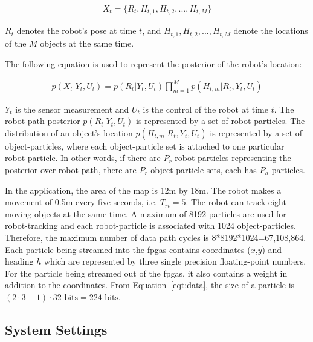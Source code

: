 \begin{equation}
\begin{aligned}
X_t = \{R_t, H_{t,1}, H_{t,2}, ..., H_{t,M}\}
\end{aligned}
\end{equation}

$R_t$ denotes the robot's pose at time $t$, and $H_{t,1}, H_{t,2}, ..., H_{t,M}$ denote the locations of the $M$ objects at the same time.

The following equation is used to represent the posterior of the robot's location:

\begin{equation}
\begin{aligned}
p(X_t|Y_t,U_t) = p(R_t|Y_t,U_t) \prod_{m=1}^M p(H_{t,m}|R_t,Y_t,U_t)
\end{aligned}
\end{equation}

$Y_t$ is the sensor measurement and $U_t$ is the control of the robot at time $t$.
The robot path posterior $p(R_t|Y_t,U_t)$ is represented by a set of robot-particles.
The distribution of an object's location $p(H_{t,m}|R_t,Y_t,U_t)$ is represented by a set of object-particles, where each object-particle set is attached to one particular robot-particle.
In other words, if there are $P_r$ robot-particles representing the posterior over robot path, there are $P_r$ object-particle sets, each has $P_h$ particles.

In the application, the area of the map is 12m by 18m.
The robot makes a movement of 0.5m every five seconds, i.e. $T_{rt} = 5$.
The robot can track eight moving objects at the same time.
A maximum of 8192 particles are used for robot-tracking and each robot-particle is associated with 1024 object-particles.
Therefore, the maximum number of data path cycles is 8*8192*1024=67,108,864.
Each particle being streamed into the \gls{fpga}s contains coordinates ($x$,$y$) and heading $h$ which are represented by three single precision floating-point numbers.
For the particle being streamed out of the \gls{fpga}s, it also contains a weight in addition to the coordinates.
From Equation~\ref{eqt:data}, the size of a particle is $(2 \cdot 3 + 1) \cdot 32 \mbox{ bits} = 224 \mbox{ bits}$.

\subsection{System Settings}

